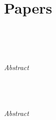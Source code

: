 
\part{Papers}

\setcounter{chapter}{0}
\setcounter{thm}{0}
\setcounter{remark}{0}
\setcounter{secnumdepth}{3}
\renewcommand{\thechapter}{\Alph{chapter}}
\renewcommand{\thesection}{\arabic{section}}
\renewcommand{\thefigure}{\arabic{figure}}
\renewcommand{\theequation}{\arabic{equation}}
\renewcommand{\thetable}{\arabic{table}}


\chapter{\atva}\label{pap:atva}
\nikola 
\masaryk\\
\jan
\tum\\
\kim \mhm \jiri
\aau
\paragraph{Abstract}

\newpage





\setcounter{thm}{0}
\setcounter{remark}{0}
\setcounter{secnumdepth}{3}
\renewcommand{\thechapter}{\Alph{chapter}}
\renewcommand{\thesection}{\arabic{section}}
\renewcommand{\thefigure}{\arabic{figure}}
\renewcommand{\theequation}{\arabic{equation}}
\renewcommand{\thetable}{\arabic{table}}


\chapter{\memics}\label{pap:memics}
\mhm \kim 
\aau\\
\liu
\iscas

\paragraph{Abstract}

\newpage




\setcounter{thm}{0}
\setcounter{remark}{0}
\setcounter{secnumdepth}{3}
\renewcommand{\thechapter}{\Alph{chapter}}
\renewcommand{\thesection}{\arabic{section}}
\renewcommand{\thefigure}{\arabic{figure}}
\renewcommand{\theequation}{\arabic{equation}}
\renewcommand{\thetable}{\arabic{table}}


